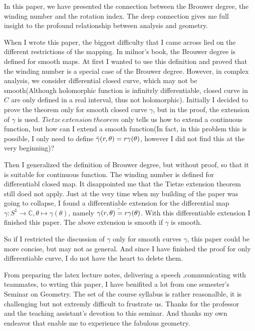 \documentclass[11pt]{article}
\numberwithin{equation}{section} \numberwithin{theorem}{section}
\numberwithin{lemma}{section} \numberwithin{remark}{section}
\numberwithin{table}{section} \numberwithin{corollary}{section}
\numberwithin{example}{section} \numberwithin{conjecture}{section}
\numberwithin{assumption}{section}
\numberwithin{definition}{section}
\numberwithin{proposition}{section}
\begin{document}
In this paper, we have presented the connection between the Brouwer degree, the winding number and the rotation index. The deep connection gives me full insight to the profound relationship between analysis and geometry.

When I wrote this paper, the biggest difficulty that I came across lied on the different restrictions of the mapping. In milnor's book, the Brouwer degree is defined for smooth maps. At first I wanted to use this definition and proved that the winding number is a special case of the Brouwer degree.
However, in complex analysis, we consider differential closed curve, which may not be smooth(Although holomorphic function is infinitrly differentiable, closed curve in $C$ are only defined in a real interval, thus not holomorphic).
Initially I decided to prove the theorem only for smooth closed curve $\gamma$, but in the proof, the extension of $\gamma$ is used. $Tietze\  extension \ theorem$ only tells us how to extend a continuous function, but how can I extend a smooth function(In fact, in this problem this is possible, I only need to define $\Bar{\gamma}(r,\theta)=r\gamma(\theta)$, however I did not find this at the very beginning)? 

Then I generalized the definition of Brouwer degree, but without proof, so that it is suitable for continuous function. The winding number is defined for differentiabl closed map. It disappointed me that the Tietze extension theorem still doed not apply. Just at the very time when my building of the paper was going to collapse, I found a differentiable extension for the differential map $\gamma:S^1\rightarrow \mathbb{C},\theta\mapsto \gamma(\theta)$, namely $\Bar{\gamma(r,\theta)=r\gamma(\theta)}$. With this differentiable extension I finished this paper. 
The above extension is smooth if $\gamma$ is smooth. 

So if I restricted the discussion of $\gamma$ only for smooth curves $\gamma$, this paper could be more concise, but may not as general. And since I have finished the proof for only differentiable curve, I do not have the heart to delete them. 

From preparing the latex lecture notes, delivering a speech ,communicating with teammates, to wrting this paper, I have benifited a lot from one semester's Seminar on Geometry.  The set of the course syllabus is rather reasonalble, it is challenging but not extremly difficult to frustrate us. Thanks for the professor and the teaching assistant's devotion to this seminar. And thanks my own endeavor that enable me to experience the fabulous geometry.



 
\end{document}
